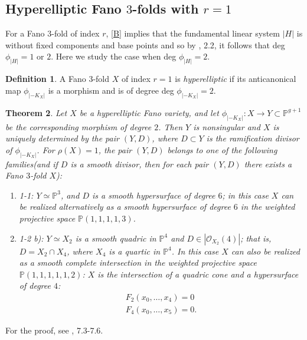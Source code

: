 \documentclass[11pt]{amsart}
\theoremstyle{plain}
\newtheorem{theorem}{Theorem}[section]
\theoremstyle{definition}
\newtheorem{definition}[theorem]{Definition}
\theoremstyle{expl}
\begin{document}
\subsection{Hyperelliptic Fano $3$-folds with $r=1$}
For a Fano $3$-fold of index $r$, \ref{B} implies that the fundamental linear system $|H|$ is without fixed components and base points and so by \cite{Isk77}, 2.2, it follows that deg $\phi_{|H|} =1$ or $2$. Here we study the case when deg $\phi_{|H|}=2$. 
\begin{definition}
    A Fano $3$-fold $X$ of index $r=1$ is \textit{hyperelliptic} if its anticanonical map $\phi_{|-K_X|}$ is a morphism and is of degree deg $\phi_{|-K_X|} = 2$.
\end{definition}
\begin{theorem}
    Let $X$ be a hyperelliptic Fano variety, and let $\phi_{|-K_X|} : X \to Y \subset \mathbb{P}^{g+1}$ be the corresponding morphism of degree $2$. Then $Y$ is nonsingular and $X$ is uniquely determined by the pair $(Y,D)$, where $D\subset Y$ is the ramification divisor of $\phi_{|-K_X|}$. For $\rho(X)=1$, 
    the pair $(Y,D)$ belongs to one of the following families(and if $D$ is a smooth divisor, then for each pair $(Y,D)$ there exists a Fano $3$-fold $X$):
    \begin{enumerate}
        \item[(i)] 1-1: $Y \simeq \mathbb{P}^3$, and $D$ is a smooth hypersurface of degree $6$; in this case $X$ can be realized alternatively as a smooth hypersurface of degree $6$ in the weighted projective space $\mathbb{P}(1,1,1,1,3)$. 
        \item[(ii)] 1-2 b): $Y \simeq X_2$ is a smooth quadric in $\mathbb{P}^4$ and $D \in |\mathcal{O}_{X_2}(4)|$; that is, $D = X_2 \cap X_4$, where $X_4$ is a quartic in $\mathbb{P}^4$. In this case $X$ can also be realized as a smooth complete intersection in the weighted projective space $\mathbb{P}(1,1,1,1,1,2)$: $X$ is the intersection of a quadric cone and a hypersurface of degree $4$:
        \begin{gather*}
        F_2(x_0,  \dots , x_4)=0 \\
        F_4(x_0, \dots , x_5)=0.
        \end{gather*}
    \end{enumerate}
\end{theorem}
For the proof, see \cite{Isk77}, 7.3-7.6.
\end{document}

